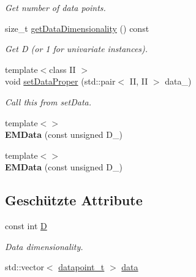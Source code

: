 \begin{DoxyCompactItemize}
\begin{DoxyCompactList}\small\item\em Get number of data points. \item\end{DoxyCompactList}\item 
size\_\-t \hyperlink{classCDA_1_1EMData_afa10d17ad30e4f69523ae38f83e31d43}{getDataDimensionality} () const 
\begin{DoxyCompactList}\small\item\em Get D (or 1 for univariate instances). \item\end{DoxyCompactList}\item 
\hypertarget{classCDA_1_1EMData_afb77ebc6925ea093d9845404eb7a655a}{
{\footnotesize template$<$class II $>$ }\\void \hyperlink{classCDA_1_1EMData_afb77ebc6925ea093d9845404eb7a655a}{setDataProper} (std::pair$<$ II, II $>$ data\_\-)}
\label{classCDA_1_1EMData_afb77ebc6925ea093d9845404eb7a655a}

\begin{DoxyCompactList}\small\item\em Call this from setData. \item\end{DoxyCompactList}\item 
\hypertarget{classCDA_1_1EMData_ace81aa73248341304cc5c3f07b393d2f}{
{\footnotesize template$<$$>$ }\\{\bfseries EMData} (const unsigned D\_\-)}
\label{classCDA_1_1EMData_ace81aa73248341304cc5c3f07b393d2f}

\item 
\hypertarget{classCDA_1_1EMData_a2e60deb860b4b777b439cbd1d96829e7}{
{\footnotesize template$<$$>$ }\\{\bfseries EMData} (const unsigned D\_\-)}
\label{classCDA_1_1EMData_a2e60deb860b4b777b439cbd1d96829e7}

\end{DoxyCompactItemize}
\subsection*{Geschützte Attribute}
\begin{DoxyCompactItemize}
\item 
\hypertarget{classCDA_1_1EMData_a6cf6b6652a2cd7a236823a6d46b9b2ca}{
const int \hyperlink{classCDA_1_1EMData_a6cf6b6652a2cd7a236823a6d46b9b2ca}{D}}
\label{classCDA_1_1EMData_a6cf6b6652a2cd7a236823a6d46b9b2ca}

\begin{DoxyCompactList}\small\item\em Data dimensionality. \item\end{DoxyCompactList}\item 
std::vector$<$ \hyperlink{classCDA_1_1EMData_a320dfbd3ad13091a99602a140688a05d}{datapoint\_\-t} $>$ \hyperlink{classCDA_1_1EMData_a2c3eec1a4ba1476128790235bf814a21}{data}
\end{DoxyCompactItemize}



